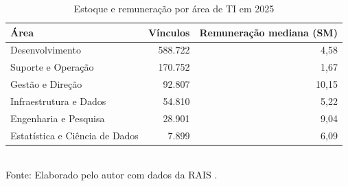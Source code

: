\begin{table}[htbp]
    \centering
    \caption{Estoque e remuneração por área de TI em 2025}
    \label{tab:areas}
    \footnotesize
    \renewcommand{\arraystretch}{1.25}
    \begin{tabular}{lrr}
        \toprule
        \rowcolor{black!8}
        \textbf{Área} & \textbf{Vínculos} & \textbf{Remuneração mediana (SM)} \\
        \midrule
        Desenvolvimento & 588.722 & 4,58 \\
        Suporte e Operação & 170.752 & 1,67 \\
        Gestão e Direção & 92.807 & 10,15 \\
        Infraestrutura e Dados & 54.810 & 5,22 \\
        Engenharia e Pesquisa & 28.901 & 9,04 \\
        Estatística e Ciência de Dados & 7.899 & 6,09 \\
        \bottomrule
    \end{tabular}
    \\[4pt]
    Fonte: Elaborado pelo autor com dados da RAIS \cite{RAIS2024}.
\end{table}
